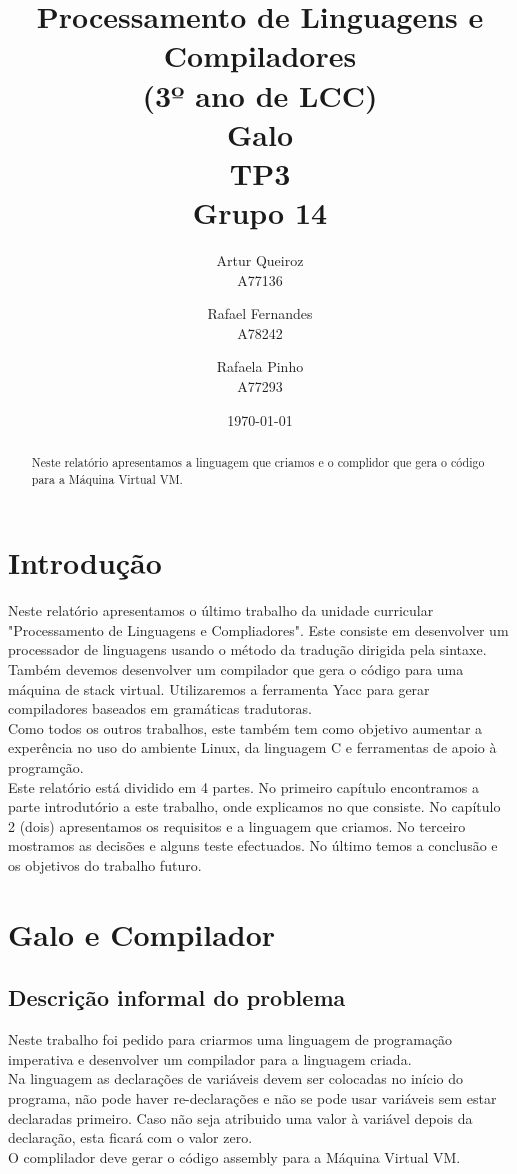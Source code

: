 \documentclass{report}
\title{Processamento de Linguagens e Compiladores\\ (3º ano de LCC)\\ \textbf{Galo}\\ TP3\\ Grupo 14}
\author{Artur Queiroz\\ A77136 \and  Rafael Fernandes\\ A78242 \and Rafaela Pinho\\ A77293 }
\date{\today}
\begin{document}
	
\maketitle
	

\begin{abstract}
	Neste relatório apresentamos a linguagem que criamos e o complidor que gera o código para a Máquina Virtual VM.
\end{abstract}

\tableofcontents

\chapter{Introdução} \label{intro}
\indent
Neste relatório apresentamos o último trabalho da unidade curricular "Processamento de Linguagens e Compliadores". Este consiste em desenvolver um processador de linguagens usando o método da tradução dirigida pela sintaxe. Também devemos desenvolver um compilador que gera o código para uma máquina de stack virtual. Utilizaremos a ferramenta Yacc para gerar compiladores baseados em gramáticas tradutoras.\\
\indent
Como todos os outros trabalhos, este também tem como objetivo aumentar a experência no uso do ambiente Linux, da linguagem C e  ferramentas de apoio à programção.\\
\indent
Este relatório está dividido em 4 partes. No primeiro capítulo encontramos a parte introdutório a este trabalho, onde explicamos no que consiste. No capítulo 2 (dois) apresentamos os requisitos e a linguagem que criamos. No terceiro mostramos as decisões e alguns teste efectuados. No último temos a conclusão e os objetivos do trabalho futuro.
 
\chapter{Galo e Compilador} \label{fi}
\section{Descrição informal do problema}
\indent
Neste trabalho foi pedido para criarmos uma linguagem de programação imperativa e desenvolver um compilador para a linguagem criada.\\
\indent
Na linguagem as declarações de variáveis devem ser colocadas no início do programa, não pode haver re-declarações e não se pode usar variáveis sem estar declaradas primeiro. Caso não seja atribuido uma valor à variável depois da declaração, esta ficará com o valor zero.\\
\indent  	
O complilador deve gerar o código assembly para a Máquina Virtual VM.
\end{document}
